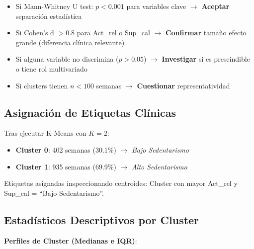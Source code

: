 \documentclass[12pt,letterpaper,twoside]{report}
\begin{document}
\begin{calculobox}
\begin{reglabox}
\begin{itemize}[noitemsep]
    \item Si Mann-Whitney U test: $p < 0.001$ para variables clave $\to$ \textbf{Aceptar} separación estadística
    \item Si Cohen's d $> 0.8$ para Act\_rel o Sup\_cal $\to$ \textbf{Confirmar} tamaño efecto grande (diferencia clínica relevante)
    \item Si alguna variable no discrimina ($p > 0.05$) $\to$ \textbf{Investigar} si es prescindible o tiene rol multivariado
    \item Si clusters tienen $n < 100$ semanas $\to$ \textbf{Cuestionar} representatividad
\end{itemize}
\end{reglabox}

\subsection{Asignación de Etiquetas Clínicas}

Tras ejecutar K-Means con $K=2$:
\begin{itemize}[noitemsep]
    \item \textbf{Cluster 0}: 402 semanas (30.1\%) $\to$ \textit{Bajo Sedentarismo}
    \item \textbf{Cluster 1}: 935 semanas (69.9\%) $\to$ \textit{Alto Sedentarismo}
\end{itemize}

Etiquetas asignadas inspeccionando centroides: Cluster con mayor Act\_rel y Sup\_cal = ``Bajo Sedentarismo''.

\subsection{Estadísticos Descriptivos por Cluster}

\begin{calculobox}
\textbf{Perfiles de Cluster (Medianas e IQR)}:

\begin{table}[H]
\centering
\caption{Perfiles de Cluster: Estadísticos Descriptivos}
\label{tab:cluster_profiles}
\end{table}
\end{calculobox}


\end{calculobox}
\end{document}

